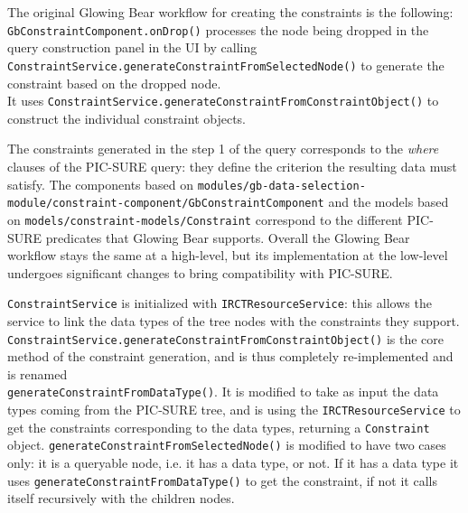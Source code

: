 The original Glowing Bear workflow for creating the constraints is the following: \\
\verb|GbConstraintComponent.onDrop()| processes the node being dropped in the query construction panel in the UI by calling \verb|ConstraintService.generateConstraintFromSelectedNode()| to generate the constraint based on the dropped node. \\
It uses \verb|ConstraintService.generateConstraintFromConstraintObject()| to construct the individual constraint objects.

The constraints generated in the step 1 of the query corresponds to the \emph{where} clauses of the PIC-SURE query: they define the criterion the resulting data must satisfy.
The components based on \verb|modules/gb-data-selection-module/constraint-component/GbConstraintComponent| and the models based on \verb|models/constraint-models/Constraint| correspond to the different PIC-SURE predicates that Glowing Bear supports.
Overall the Glowing Bear workflow stays the same at a high-level, but its implementation at the low-level undergoes significant changes to bring compatibility with PIC-SURE.

\verb|ConstraintService| is initialized with \verb|IRCTResourceService|: this allows the service to link the data types of the tree nodes with the constraints they support. \\
\verb|ConstraintService.generateConstraintFromConstraintObject()| is the core method of the constraint generation, and is thus completely re-implemented and is renamed \\
\verb|generateConstraintFromDataType()|.
It is modified to take as input the data types coming from the PIC-SURE tree, and is using the \verb|IRCTResourceService| to get the constraints corresponding to the data types, returning a \verb|Constraint| object.
\verb|generateConstraintFromSelectedNode()| is modified to have two cases only: it is a queryable node, i.e. it has a data type, or not. If it has a data type it uses \verb|generateConstraintFromDataType()| to get the constraint, if not it calls itself recursively with the children nodes.

